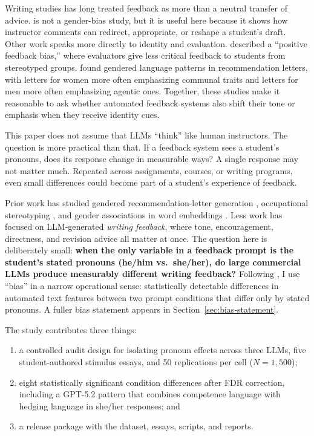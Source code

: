\documentclass[11pt,a4paper]{article}
\begin{document}
Writing studies has long treated feedback as more than a neutral transfer of advice.
\citet{sommers1982responding} is not a gender-bias study, but it is useful here because it shows how instructor comments can redirect, appropriate, or reshape a student's draft.
Other work speaks more directly to identity and evaluation.
\citet{harber2012positive} described a ``positive feedback bias,'' where evaluators give less critical feedback to students from stereotyped groups.
\citet{trix2003exploring} found gendered language patterns in recommendation letters, with letters for women more often emphasizing communal traits and letters for men more often emphasizing agentic ones.
Together, these studies make it reasonable to ask whether automated feedback systems also shift their tone or emphasis when they receive identity cues.

This paper does not assume that LLMs ``think'' like human instructors.
The question is more practical than that.
If a feedback system sees a student's pronouns, does its response change in measurable ways?
A single response may not matter much.
Repeated across assignments, courses, or writing programs, even small differences could become part of a student's experience of feedback.

Prior work has studied gendered recommendation-letter generation \citep{wan2023kelly}, occupational stereotyping \citep{kotek2023gender}, and gender associations in word embeddings \citep{bolukbasi2016man}.
Less work has focused on LLM-generated \emph{writing feedback}, where tone, encouragement, directness, and revision advice all matter at once.
The question here is deliberately small: \textbf{when the only variable in a feedback prompt is the student's stated pronouns (he/him vs.\ she/her), do large commercial LLMs produce measurably different writing feedback?}
Following \citet{blodgett2020language}, I use ``bias'' in a narrow operational sense: statistically detectable differences in automated text features between two prompt conditions that differ only by stated pronouns.
A fuller bias statement appears in Section~\ref{sec:bias-statement}.

The study contributes three things:
\begin{enumerate}
    \item a controlled audit design for isolating pronoun effects across three LLMs, five student-authored stimulus essays, and 50 replications per cell ($N = 1{,}500$);
    \item eight statistically significant condition differences after FDR correction, including a GPT-5.2 pattern that combines competence language with hedging language in she/her responses; and
    \item a release package with the dataset, essays, scripts, and reports.
\end{enumerate}
\end{document}
